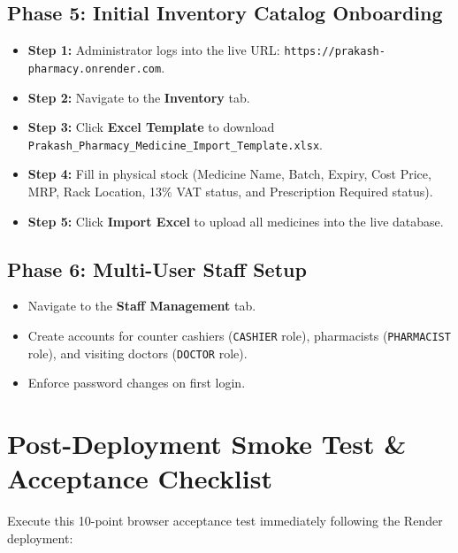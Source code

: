 \documentclass[10pt,a4paper]{article}
\begin{document}
\subsection{Phase 5: Initial Inventory Catalog Onboarding}
\begin{itemize}
    \item \textbf{Step 1:} Administrator logs into the live URL: \texttt{https://prakash-pharmacy.onrender.com}.
    \item \textbf{Step 2:} Navigate to the \textbf{Inventory} tab.
    \item \textbf{Step 3:} Click \textbf{Excel Template} to download \texttt{Prakash\_Pharmacy\_Medicine\_Import\_Template.xlsx}.
    \item \textbf{Step 4:} Fill in physical stock (Medicine Name, Batch, Expiry, Cost Price, MRP, Rack Location, 13\% VAT status, and Prescription Required status).
    \item \textbf{Step 5:} Click \textbf{Import Excel} to upload all medicines into the live database.
\end{itemize}

\subsection{Phase 6: Multi-User Staff Setup}
\begin{itemize}
    \item Navigate to the \textbf{Staff Management} tab.
    \item Create accounts for counter cashiers (\texttt{CASHIER} role), pharmacists (\texttt{PHARMACIST} role), and visiting doctors (\texttt{DOCTOR} role).
    \item Enforce password changes on first login.
\end{itemize}

\section{Post-Deployment Smoke Test \& Acceptance Checklist}

Execute this 10-point browser acceptance test immediately following the Render deployment:
\end{document}
